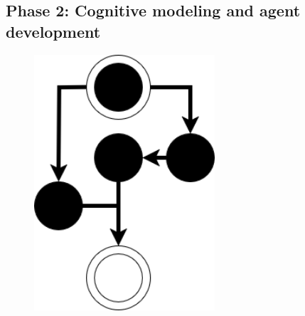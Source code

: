 \documentclass[12pt,a4paper]{article} %
\begin{document}
	\subsection{Phase 2: Cognitive modeling and agent development}

	\begin{figure}[H]
		\centering
		\begin{minipage}[b]{0.3\textwidth}
			\centering
		\end{minipage}
		\begin{minipage}[b]{0.3\textwidth}
			\centering
			\includegraphics[width=0.6\textwidth]{images/workflow_icon.png}

\end{minipage}
\end{figure}
\end{document}
